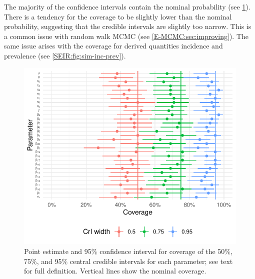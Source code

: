 \documentclass[thesis.tex]{subfiles}
\begin{document}
The majority of the confidence intervals contain the nominal probability (see \cref{SEIR:fig:sim-coverage}).
There is a tendency for the coverage to be slightly lower than the nominal probability, suggesting that the credible intervals are slightly too narrow.
This is a common issue with random walk MCMC (see \cref{E-MCMC:sec:improving}).
The same issue arises with the coverage for derived quantities incidence and prevalence (see \cref{SEIR:fig:sim-inc-prev}).
\begin{figure}
    \includegraphics{SEIR/sim/coverage}
    \caption[Coverage of simulation study]{%
        Point estimate and 95\% confidence interval for coverage of the 50\%, 75\%, and 95\% central credible intervals for each parameter; see text for full definition.
        Vertical lines show the nominal coverage.
    }
    \label{SEIR:fig:sim-coverage}
\end{figure}
\end{document}
